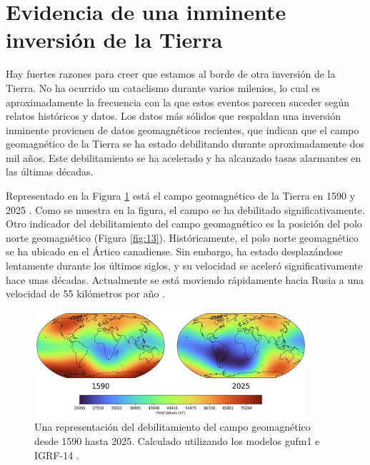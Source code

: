 \documentclass[10pt,twocolumn,letterpaper]{article}
\begin{document}
\section{Evidencia de una inminente inversión de la Tierra}

Hay fuertes razones para creer que estamos al borde de otra inversión de la Tierra. No ha ocurrido un cataclismo durante varios milenios, lo cual es aproximadamente la frecuencia con la que estos eventos parecen suceder según relatos históricos y datos. Los datos más sólidos que respaldan una inversión inminente provienen de datos geomagnéticos recientes, que indican que el campo geomagnético de la Tierra se ha estado debilitando durante aproximadamente dos mil años. Este debilitamiento se ha acelerado y ha alcanzado tasas alarmantes en las últimas décadas.

Representado en la Figura \ref{fig:14} está el campo geomagnético de la Tierra en 1590 y 2025 \cite{125,126}. Como se muestra en la figura, el campo se ha debilitado significativamente.
Otro indicador del debilitamiento del campo geomagnético es la posición del polo norte geomagnético (Figura \ref{fig:13}). Históricamente, el polo norte geomagnético se ha ubicado en el Ártico canadiense. Sin embargo, ha estado desplazándose lentamente durante los últimos siglos, y su velocidad se aceleró significativamente hace unas décadas. Actualmente se está moviendo rápidamente hacia Rusia a una velocidad de 55 kilómetros por año \cite{124}.

\begin{figure}[t]
\begin{center}
\includegraphics[width=0.9\textwidth]{saa.jpg}
\end{center}
   \caption{Una representación del debilitamiento del campo geomagnético desde 1590 hasta 2025. Calculado utilizando los modelos gufm1 e IGRF-14 \cite{125,126}.}
\label{fig:14}
\end{figure}
\end{document}
